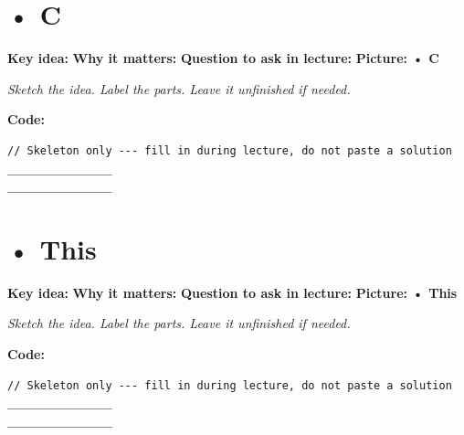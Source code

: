 \documentclass[12pt]{article}
\newcommand{\deflabel}[1]{\noindent\textcolor{slotdef}{\textbf{#1}}}
\newcommand{\drawlabel}[1]{\noindent\textcolor{slotdraw}{\textbf{#1}}}
\begin{document}
\section{• C}
\Needspace{0.16\textheight}
\deflabel{Key idea:}
\vspace{1.1em}
\Needspace{0.16\textheight}
\deflabel{Why it matters:}
\vspace{1.1em}
\Needspace{0.16\textheight}
\deflabel{Question to ask in lecture:}
\vspace{1.1em}
\Needspace{0.28\textheight}
\drawlabel{Picture: • C}
{\color{slotdraw}
\begin{framed}
\color{ink}
\begin{minipage}[t][0.22\textheight]{\textwidth}
\vspace{0.4em}
\textit{Sketch the idea. Label the parts. Leave it unfinished if needed.}
\end{minipage}
\end{framed}
}
\vspace{1em}
\Needspace{0.18\textheight}
\drawlabel{Code:}
\begin{lstlisting}
// Skeleton only --- fill in during lecture, do not paste a solution
________________
________________
\end{lstlisting}
\vspace{1em}
\section{• This}
\Needspace{0.16\textheight}
\deflabel{Key idea:}
\vspace{1.1em}
\Needspace{0.16\textheight}
\deflabel{Why it matters:}
\vspace{1.1em}
\Needspace{0.16\textheight}
\deflabel{Question to ask in lecture:}
\vspace{1.1em}
\Needspace{0.28\textheight}
\drawlabel{Picture: • This}
{\color{slotdraw}
\begin{framed}
\color{ink}
\begin{minipage}[t][0.22\textheight]{\textwidth}
\vspace{0.4em}
\textit{Sketch the idea. Label the parts. Leave it unfinished if needed.}
\end{minipage}
\end{framed}
}
\vspace{1em}
\Needspace{0.18\textheight}
\drawlabel{Code:}
\begin{lstlisting}
// Skeleton only --- fill in during lecture, do not paste a solution
________________
________________
\end{lstlisting}
\vspace{1em}
\end{document}
